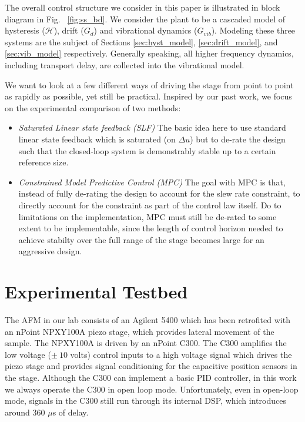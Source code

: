 \documentclass[journal,twocolumn,twoside]{IEEEtran}
\begin{document}

The overall control structure we consider in this paper is illustrated in block diagram in Fig. ~\ref{fig:ss_bd}. We consider the plant to be a cascaded model of hysteresis ($\mathcal{H}$),  drift ($G_d$) and vibrational dynamics ($G_{vib}$). Modeling these three systems are the subject of Sections \ref{sec:hyst_model}, \ref{sec:drift_model}, and \ref{sec:vib_model} respectively. Generally speaking, all higher frequency dynamics, including transport delay, are collected into the vibrational model.




We want to look at a few different ways of driving the stage from point to point as rapidly as possible, yet still be practical. Inspired by our past work, we focus on the experimental comparison of two methods:
\begin{itemize}
\item\emph{Saturated Linear state feedback (SLF)} The basic idea here to use standard linear state feedback which is saturated (on $\Delta u$) but to de-rate the design such that the closed-loop system is demonstrably stable up to a certain reference size. 
\item\emph{Constrained Model Predictive Control (MPC)} The goal with MPC is that, instead of fully de-rating the design to account for the slew rate constraint, to directly account for the constraint as part of the control law itself. Do to limitations on the implementation, MPC must still be de-rated to some extent to be implementable, since the length of control horizon needed to achieve stabilty over the full range of the stage becomes large for an aggressive design.
\end{itemize}




\section{Experimental Testbed}\label{sec:testbed}


The AFM in our lab consists of an Agilent 5400 which has been retrofited with an nPoint NPXY100A piezo stage, which provides lateral movement of the sample. The NPXY100A is driven by an nPoint C300. The C300 amplifies the low voltage ($\pm~10$ volts) control inputs to a high voltage signal which drives the piezo stage and provides signal conditioning for the capacitive position sensors in the stage. Although the C300 can implement a basic PID controller, in this work we always operate the C300 in open loop mode. Unfortunately, even in open-loop mode, signals in the C300 still run through its internal DSP, which introduces around 360 $\mu$s of delay. 
\end{document}

